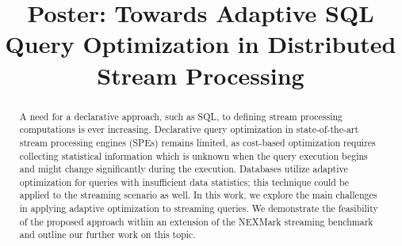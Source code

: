 \documentclass[sigconf]{acmart}
\theoremstyle{remark}
\begin{document}

\title {Poster: Towards Adaptive SQL Query Optimization in Distributed Stream Processing}








\begin{abstract}

A need for a declarative approach, such as SQL, to defining stream processing computations is ever increasing. Declarative query optimization in state-of-the-art stream processing engines (SPEs) remains limited, as cost-based optimization requires collecting statistical information which is unknown when the query execution begins and might change significantly during the execution. Databases utilize adaptive optimization for queries with insufficient data statistics; this technique could be applied to the streaming scenario as well. In this work, we explore the main challenges in applying adaptive optimization to streaming queries. We demonstrate the feasibility of the proposed approach within an extension of the NEXMark streaming benchmark and outline our further work on this topic.

\end{abstract}
\end{document}
